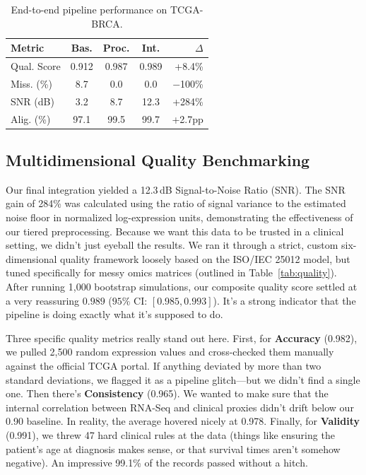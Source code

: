 \documentclass[conference,flushend]{iaria} %
\begin{document}
\begin{table}[H]
\caption{End-to-end pipeline performance on TCGA-BRCA.}\label{tab:results}
\centering
\small
\setlength{\tabcolsep}{3pt}
\begin{tabular}{l c c c r}
\toprule
\textbf{Metric} & \textbf{Bas.} & \textbf{Proc.} & \textbf{Int.} & \textbf{$\Delta$} \\
\midrule
Qual. Score     & 0.912     & 0.987     & 0.989     & +8.4\% \\
Miss. (\%)      & 8.7       & 0.0       & 0.0       & $-$100\% \\
SNR (dB)        & 3.2       & 8.7       & 12.3      & +284\% \\
Alig. (\%)      & 97.1      & 99.5      & 99.7      & +2.7pp \\
\bottomrule
\end{tabular}
\end{table}

\subsection{Multidimensional Quality Benchmarking}
Our final integration yielded a 12.3\,dB Signal-to-Noise Ratio (SNR). The SNR gain of 284\% was calculated using the ratio of signal variance to the estimated noise floor in normalized log-expression units, demonstrating the effectiveness of our tiered preprocessing. Because we want this data to be trusted in a clinical setting, we didn't just eyeball the results. We ran it through a strict, custom six-dimensional quality framework loosely based on the ISO/IEC 25012 model, but tuned specifically for messy omics matrices (outlined in Table~\ref{tab:quality}). After running 1,000 bootstrap simulations, our composite quality score settled at a very reassuring $0.989$ ($95\%$ CI: $[0.985, 0.993]$). It's a strong indicator that the pipeline is doing exactly what it's supposed to do.

Three specific quality metrics really stand out here. First, for \textbf{Accuracy} (0.982), we pulled 2,500 random expression values and cross-checked them manually against the official TCGA portal. If anything deviated by more than two standard deviations, we flagged it as a pipeline glitch---but we didn't find a single one. Then there's \textbf{Consistency} (0.965). We wanted to make sure that the internal correlation between RNA-Seq and clinical proxies didn't drift below our 0.90 baseline. In reality, the average hovered nicely at 0.978. Finally, for \textbf{Validity} (0.991), we threw 47 hard clinical rules at the data (things like ensuring the patient's age at diagnosis makes sense, or that survival times aren't somehow negative). An impressive 99.1\% of the records passed without a hitch.
\end{document}
